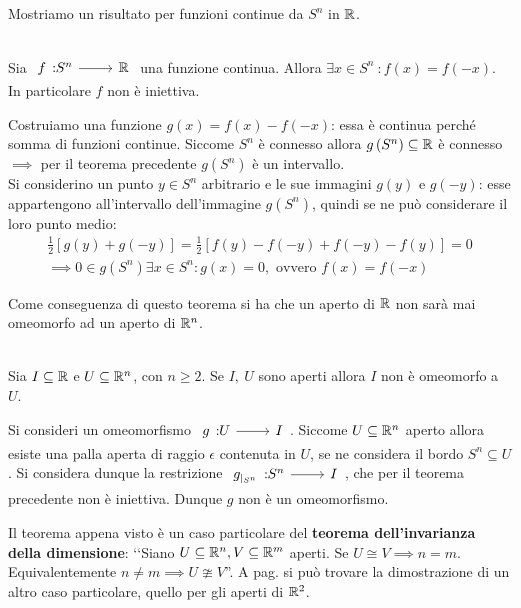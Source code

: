 Mostriamo un risultato per funzioni continue da $S^n$ in $\mathbb{R}$.
\begin{theorema}~{}\label{non iniettività S^n in realset}\\
Sia $\funz f {S^n} \realset$ una funzione continua. Allora $\exists x\in S^n \ \colon f(x)=f(-x)$. In particolare $f$ non è iniettiva.
\end{theorema}
\begin{demonstration}
	Costruiamo una funzione $g(x)=f(x)-f(-x)$: essa è continua perché somma di funzioni continue. Siccome $S^n$ è connesso allora $g\left( S^n\right)\subseteq\mathbb{R}$ è connesso $\implies$ per il teorema precedente $g\left(S^n\right)$ è un intervallo.\\
	Si considerino un punto $y\in S^n$ arbitrario e le sue immagini $g(y)$ e $g(-y)$: esse appartengono all'intervallo dell'immagine $g\left( S^n\right)$, quindi se ne può considerare il loro punto medio:
		\begin{gather*}
			\frac{1}{2}\left[ g(y) + g(-y)\right]=\frac{1}{2} \left[ f(y) -f(-y) + f(-y) -f(y) \right]= 0\\
			\implies 0\in g\left(S^n\right)\exists x\in S^n \colon g(x)=0, \text{ ovvero } f(x)=f(-x)
		\end{gather*}
	\vspace{-3mm}
\end{demonstration}
Come conseguenza di questo teorema si ha che un aperto di $\mathbb{R}$ non sarà mai omeomorfo ad un aperto di $\mathbb{R}^n$.
\begin{theorema}~{}\\
Sia $I\subseteq\mathbb{R}$ e $U\subseteq\mathbb{R}^n$, con $n\geq 2$. Se $I,\ U$ sono aperti allora $I$ non è omeomorfo a $U$.	
\end{theorema}	
\begin{demonstration}
	Si consideri un omeomorfismo $\funz g U I$. Siccome $U\subseteq\mathbb{R}^n$ aperto allora esiste una palla aperta di raggio $\epsilon$ contenuta in $U$, se ne considera il bordo $S^n\subseteq U$. Si considera dunque la restrizione $\funz {g_{|_{S^n}}} {S^n} I$, che per il teorema precedente non è iniettiva. Dunque $g$ non è un omeomorfismo.	
\end{demonstration}

\begin{observe}
	Il teorema appena visto è un caso particolare del \textbf{teorema dell'invarianza della dimensione}: ‘‘Siano $U\subseteq\mathbb{R}^n, V\subseteq\mathbb{R}^m$ aperti. Se $U\cong V \implies n=m$. Equivalentemente $n\neq m\implies U\ncong V$''. A pag. \pageref{invarianzadimensionen=2} si può trovare la dimostrazione di un altro caso particolare, quello per gli aperti di $\mathbb{R}^2$.
\end{observe}

